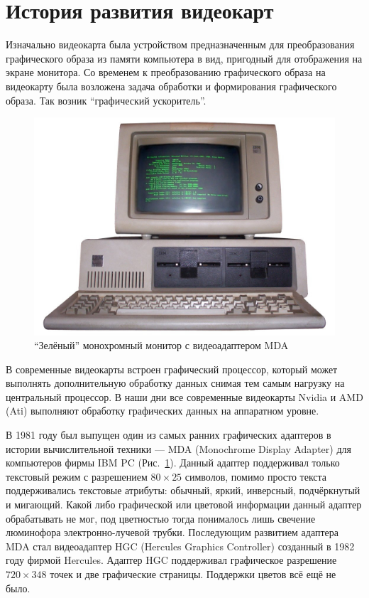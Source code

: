 \section {История развития видеокарт}

Изначально видеокарта была устройством предназначенным для преобразования графического образа из памяти компьютера в вид, пригодный для отображения на экране монитора. Со временем к преобразованию графического образа на видеокарту была возложена задача обработки и формирования графического образа. Так возник ``графический ускоритель''.

\begin{figure}[ht!]
\begin{center}
\includegraphics[width=0.5\linewidth]{img/IBM_PC_5150.jpg}
\caption{``Зелёный'' монохромный монитор с видеоадаптером MDA}
\label{ris:mda}
\end{center}
\end{figure}

В современные видеокарты встроен графический процессор, который может выполнять дополнительную обработку данных снимая тем самым нагрузку на центральный процессор. В наши дни все современные видеокарты Nvidia и AMD (Ati) выполняют обработку графических данных на аппаратном уровне.

В 1981 году был выпущен один из самых ранних графических адаптеров в истории вычислительной техники --- MDA (Monochrome Display Adapter) для компьютеров фирмы IBM PC (Рис.~\ref{ris:mda}). Данный адаптер поддерживал только текстовый режим с разрешением $80 \times 25$ символов, помимо просто текста поддерживались текстовые атрибуты: обычный, яркий, инверсный, подчёркнутый и мигающий. Какой либо графической или цветовой информации данный адаптер обрабатывать не мог, под цветностью тогда понималось лишь свечение люминофора электронно-лучевой трубки. Последующим развитием адаптера MDA стал видеоадаптер HGC (Her\-cu\-les Gra\-phics Con\-trol\-ler) созданный в 1982 году фирмой Hercules. Адаптер HGC поддерживал графическое разрешение $720 \times 348$ точек и две графические страницы. Поддержки цветов всё ещё не было.

